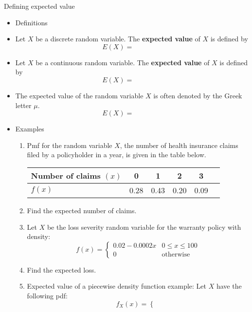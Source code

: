 \documentclass{article}
\begin{document}
Defining expected value\bigskip
\begin{itemize}
    \item Definitions
    \item[] Let $X$ be a discrete random variable. The \textbf{expected value} of $X$ is defined by\smallskip
    \[E(X) = \hspace{50pt}\]
    \item[] Let $X$ be a continuous random variable. The \textbf{expected value} of $X$ is defined by
    \[E(X) = \hspace{50pt}\]
    \item[] The expected value of the random variable $X$ is often denoted by the Greek letter $\mu$.
    \[E(X) = \hspace{50pt}\]
    \item Examples
    \begin{enumerate}
        \item Pmf for the random variable $X$, the number of health insurance claims filed by a policyholder in a year, is given in the table below.\smallskip
        \begin{center}
            \begin{tabular}{| l || c | c | c | c | c |}
                \hline
                Number of claims $(x)$ & 0 & 1 & 2 & 3\\
                \hline
                $f(x)$ & 0.28 & 0.43 & 0.20 & 0.09\\
                \hline
            \end{tabular}
        \end{center}\bigskip
        \item[] Find the expected number of claims.\vspace{70pt}
        \item Let $X$ be the loss severity random variable for the warranty policy with density:
        \[
        f(x) =
        \left\{
            \begin{array}{ll}
            0.02 - 0.0002x & 0 \le x \le 100\\
            0 & \text{otherwise}
        \end{array}
        \right.
        \]
        \item[] Find the expected loss.\vspace{70pt}
        \item Expected value of a piecewise density function example: Let $X$ have the following pdf:\smallskip
        \[
        f_X(x) =
            \left\{
            \begin{array}{ll}

\end{array}\]
\end{enumerate}
\end{itemize}
\end{document}
